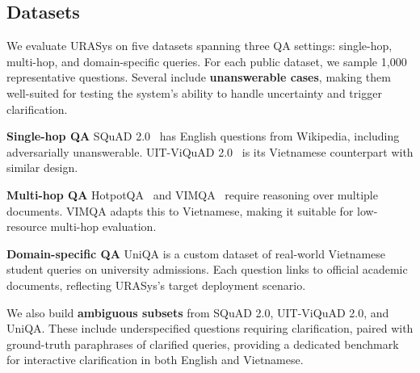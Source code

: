\documentclass[11pt]{article}
\begin{document}
\subsection{Datasets}
\label{sec:datasets}

We evaluate URASys on five datasets spanning three QA settings: single-hop, multi-hop, and domain-specific queries. For each public dataset, we sample 1{,}000 representative questions. Several include \textbf{unanswerable cases}, making them well-suited for testing the system’s ability to handle uncertainty and trigger clarification.

\smallskip
\noindent
\textbf{Single-hop QA}\quad  
SQuAD 2.0~\cite{rajpurkar-etal-2018-know} has English questions from Wikipedia, including adversarially unanswerable. UIT-ViQuAD 2.0~\cite{van2022vlsp} is its Vietnamese counterpart with similar design.


\smallskip
\noindent
\textbf{Multi-hop QA}\quad  
HotpotQA~\cite{yang-etal-2018-hotpotqa} and VIMQA~\cite{le-etal-2022-vimqa} require reasoning over multiple documents. VIMQA adapts this to Vietnamese, making it suitable for low-resource multi-hop evaluation.

\smallskip
\noindent
\textbf{Domain-specific QA}\quad  
UniQA is a custom dataset of real-world Vietnamese student queries on university admissions. Each question links to official academic documents, reflecting URASys’s target deployment scenario.

\smallskip
\noindent
We also build \textbf{ambiguous subsets} from SQuAD 2.0, UIT-ViQuAD 2.0, and UniQA. These include underspecified questions requiring clarification, paired with ground-truth paraphrases of clarified queries, providing a dedicated benchmark for interactive clarification in both English and Vietnamese.
\end{document}
